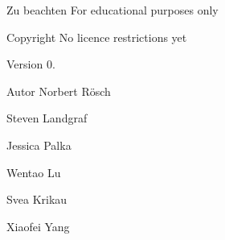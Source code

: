 \begin{DoxyNote}{Zu beachten}
For educational purposes only 
\end{DoxyNote}
\begin{DoxyCopyright}{Copyright}
No licence restrictions yet 
\end{DoxyCopyright}
\begin{DoxyVersion}{Version}
0. ~\newline
    
\end{DoxyVersion}
\begin{DoxyAuthor}{Autor}
Norbert Rösch 

Steven Landgraf 

Jessica Palka 

Wentao Lu 

Svea Krikau 

Xiaofei Yang 
\end{DoxyAuthor}
